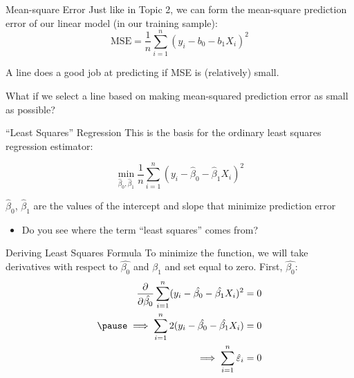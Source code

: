 \documentclass[aspectratio=169,t,11pt,table]{beamer}
\begin{document}
\begin{frame}{Mean-square Error}
  Just like in Topic 2, we can form the mean-square prediction error of our linear model (in our training sample):
  $$
    \text{MSE} = \frac{1}{n} \sum_{i=1}^n (y_i - b_0 - b_1 X_i)^2
  $$

  \bigskip
  A line does a good job at predicting if MSE is (relatively) small. 

  \pause
  \bigskip
  What if we select a line based on making mean-squared prediction error as small as possible?
\end{frame}


\begin{frame}{``Least Squares'' Regression}
  This is the basis for the \alert{ordinary least squares} regression estimator:

  $$
    \min_{\hat{\beta}_0, \hat{\beta}_1} \frac{1}{n} \sum_{i=1}^n (y_i - \hat{\beta}_0 - \hat{\beta}_1 X_i)^2
  $$

  \pause
  \bigskip
  $\hat{\beta}_0$, $\hat{\beta}_1$ are the values of the intercept and slope that minimize prediction error
  \begin{itemize}
    \item Do you see where the term ``least squares'' comes from?
  \end{itemize}
\end{frame}

\begin{frame}{Deriving Least Squares Formula}
  To minimize the function, we will take derivatives with respect to $\hat{\beta_0}$ and $\hat{\beta_1}$ and set equal to zero. First, $\hat{\beta_0}$:
  \begin{align*}
    \frac{\partial}{\partial \hat{\beta_0}} \sum_{i=1}^n (y_i - \hat{\beta_0} - \hat{\beta_1} X_i)^2 &= 0 \\
    \pause
    \implies \sum_{i=1}^n 2 (y_i - \hat{\beta_0} - \hat{\beta_1} X_i) &= 0 \\
    \implies \sum_{i=1}^n \hat{\varepsilon}_i &= 0
  \end{align*}
\end{frame}
\end{document}
